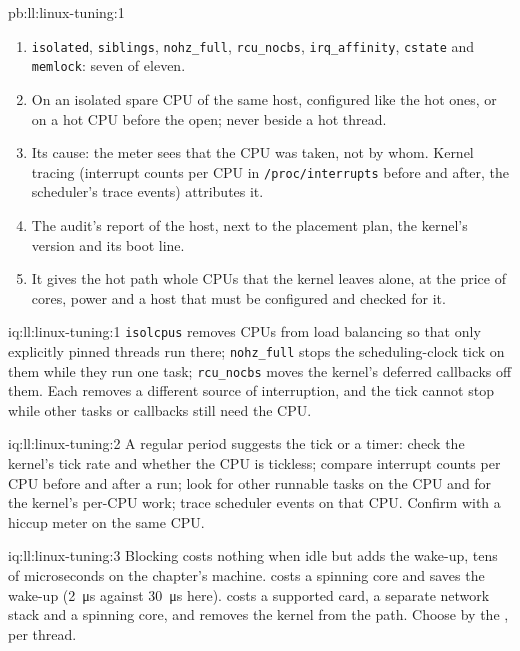 \begin{solution}{pb:ll:linux-tuning:1}
\begin{enumerate}
\qty{2}{\micro\second}: some six thousand times less time, a worst gap some 2\,700 times shorter.
\item \texttt{isolated}, \texttt{siblings}, \texttt{nohz\_full}, \texttt{rcu\_nocbs}, \texttt{irq\_affinity},
\texttt{cstate} and \texttt{memlock}: seven of eleven.
\item On an isolated spare CPU of the same host, configured like the hot ones, or on a hot CPU before the open; never beside a
hot thread.
\item Its cause: the meter sees that the CPU was taken, not by whom. Kernel tracing (interrupt counts per CPU in
\texttt{/proc/interrupts} before and after, the scheduler's trace events) attributes it.
\item The audit's report of the host, next to the placement plan, the kernel's version and its boot line.
\item It gives the hot path whole CPUs that the kernel leaves alone, at the price of cores, power and a host that must be
configured and checked for it.
\end{enumerate}
\end{solution}

\begin{solution}{iq:ll:linux-tuning:1}
\texttt{isolcpus} removes CPUs from load balancing so that only explicitly pinned threads run there; \texttt{nohz\_full} stops
the scheduling-clock tick on them while they run one task; \texttt{rcu\_nocbs} moves the kernel's deferred callbacks off them.
Each removes a different source of interruption, and the tick cannot stop while other tasks or callbacks still need the CPU.
\end{solution}

\begin{solution}{iq:ll:linux-tuning:2}
A regular period suggests the tick or a timer: check the kernel's tick rate and whether the CPU is tickless; compare interrupt
counts per CPU before and after a run; look for other runnable tasks on the CPU and for the kernel's per-CPU work; trace
scheduler events on that CPU. Confirm with a hiccup meter on the same CPU.
\end{solution}

\begin{solution}{iq:ll:linux-tuning:3}
Blocking costs nothing when idle but adds the wake-up, tens of microseconds on the chapter's machine.  costs a
spinning core and saves the wake-up (\qty{2}{\micro\second} against \qty{30}{\micro\second} here).  costs a
supported card, a separate network stack and a spinning core, and removes the kernel from the path. Choose by the , per thread.
\end{solution}

